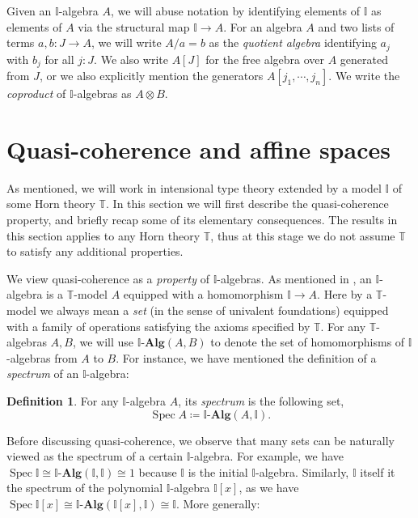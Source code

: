 \documentclass[a4paper,12pt]{amsart}
\theoremstyle{definition}
\newtheorem{definition}[theorem]{Definition}
\newcommand{\mb}[1]{\mathbf{#1}}
\newcommand{\mbb}[1]{\mathbb{#1}}
\newcommand{\T}{\mbb T}
\newcommand{\I}{\mbb I}
\newcommand{\alg}{\text{-}\mb{Alg}}
\newcommand{\spec}{\operatorname{Spec}}
\begin{document}
Given an $\I$-algebra $A$, we will abuse notation by identifying elements of $\I$ as elements of $A$ via the structural map $\I \to A$. For an algebra $A$ and two lists of terms $a,b \colon J \to A$, 
we will write $A/a = b$ as the \emph{quotient algebra} identifying $a_j$ with $b_j$ for all $j : J$. We also write $A[J]$ for the free algebra over $A$ generated from $J$, or we also explicitly mention the generators $A[j_1,\cdots,j_n]$. We write the \emph{coproduct} of $\I$-algebras as $A \otimes B$.

\section{Quasi-coherence and affine spaces}\label{sec:basics}

As mentioned, we will work in intensional type theory extended by a model $\I$ of some Horn theory $\T$. In this section we will first describe the quasi-coherence property, and briefly recap some of its elementary consequences. The results in this section applies to any Horn theory $\T$, thus at this stage we do not assume $\T$ to satisfy any additional properties.

We view quasi-coherence as a \emph{property} of $\I$-algebras. As mentioned in , an $\I$-algebra is a $\T$-model $A$ equipped with a homomorphism $\I \to A$. Here by a $\T$-model we always mean a \emph{set} (in the sense of univalent foundations) equipped with a family of operations satisfying the axioms specified by $\T$. For any $\T$-algebras $A,B$, we will use $\I\alg(A,B)$ to denote the set of homomorphisms of $\I$-algebras from $A$ to $B$. For instance, we have mentioned the definition of a \emph{spectrum} of an $\I$-algebra: 

\begin{definition}
  For any $\I$-algebra $A$, its \emph{spectrum} is the following set,
  \[ \spec A \coloneq \I\alg(A,\I). \]
\end{definition}

Before discussing quasi-coherence, we observe that many sets can be naturally viewed as the spectrum of a certain $\I$-algebra. For example, we have $\spec \I \cong \I\alg(\I,\I) \cong 1$ because  $\I$ is the initial $\I$-algebra. Similarly, $\I$ itself it the spectrum of the polynomial $\I$-algebra $\I[x]$, as we have $\spec \I[x] \cong \I\alg(\I[x],\I) \cong \I$. More generally:
\end{document}
